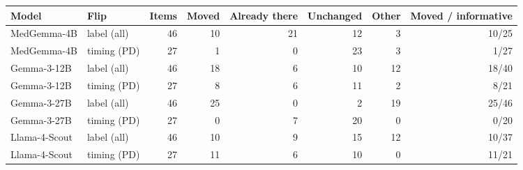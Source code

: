 \begin{tabular}{llrrrrrr}
\toprule
Model & Flip & Items & Moved & Already there & Unchanged & Other & Moved / informative \\
\midrule
MedGemma-4B & label (all) & 46 & 10 & 21 & 12 & 3 & 10/25 \\
MedGemma-4B & timing (PD) & 27 & 1 & 0 & 23 & 3 & 1/27 \\
Gemma-3-12B & label (all) & 46 & 18 & 6 & 10 & 12 & 18/40 \\
Gemma-3-12B & timing (PD) & 27 & 8 & 6 & 11 & 2 & 8/21 \\
Gemma-3-27B & label (all) & 46 & 25 & 0 & 2 & 19 & 25/46 \\
Gemma-3-27B & timing (PD) & 27 & 0 & 7 & 20 & 0 & 0/20 \\
Llama-4-Scout & label (all) & 46 & 10 & 9 & 15 & 12 & 10/37 \\
Llama-4-Scout & timing (PD) & 27 & 11 & 6 & 10 & 0 & 11/21 \\
\bottomrule
\end{tabular}
